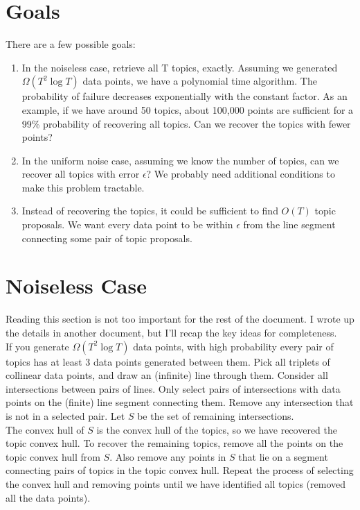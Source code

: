 \documentclass[12pt]{article}
\theoremstyle{definition}
\begin{document}
\section{Goals}

There are a few possible goals:

\begin{enumerate}
\item In the noiseless case, retrieve all T topics, exactly. Assuming we generated $\Omega(T^2\log{T})$ data points, we have a polynomial time algorithm. The probability of failure decreases exponentially with the constant factor. As an example, if we have around 50 topics, about 100,000 points are sufficient for a 99\% probability of recovering all topics. Can we recover the topics with fewer points?

\item In the uniform noise case, assuming we know the number of topics, can we recover all topics with error $\epsilon$? We probably need additional conditions to make this problem tractable.

\item Instead of recovering the topics, it could be sufficient to find $O(T)$ topic proposals. We want every data point to be within $\epsilon$ from the line segment connecting some pair of topic proposals.

\end{enumerate}

\section{Noiseless Case}

Reading this section is not too important for the rest of the document. I wrote up the details in another document, but I'll recap the key ideas for completeness.
\\

If you generate $\Omega(T^2\log{T})$ data points, with high probability every pair of topics has at least 3 data points generated between them. Pick all triplets of collinear data points, and draw an (infinite) line through them. Consider all intersections between pairs of lines. Only select pairs of intersections with data points on the (finite) line segment connecting them. Remove any intersection that is not in a selected pair. Let $S$ be the set of remaining intersections.
\\

The convex hull of $S$ is the convex hull of the topics, so we have recovered the topic convex hull. To recover the remaining topics, remove all the points on the topic convex hull from $S$. Also remove any points in $S$ that lie on a segment connecting pairs of topics in the topic convex hull. Repeat the process of selecting the convex hull and removing points until we have identified all topics (removed all the data points).
\end{document}

